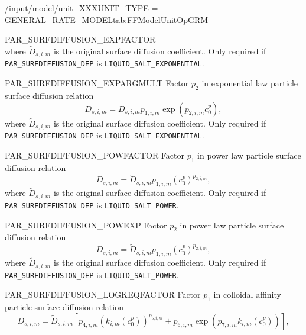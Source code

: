\begin{condsubgroup}{/input/model/unit\_XXX}{UNIT\_TYPE = GENERAL\_RATE\_MODEL}{tab:FFModelUnitOpGRM}
\begin{dataset}[unit=--,type=double,range={$\geq 0$},length={\texttt{NBND}}]{PAR\_SURFDIFFUSION\_EXPFACTOR}
\begin{equation*}
    \end{equation*}
    where $\tilde{D}_{s,i,m}$ is the original surface diffusion coefficient.
    Only required if \texttt{PAR\_SURFDIFFUSION\_DEP} is \texttt{LIQUID\_SALT\_EXPONENTIAL}.
  \end{dataset}
  \begin{dataset}[unit=\si{\cubic\metre\of{MP}\per\mol},type=double,range={$\mathds{R}$},length={\texttt{NBND}}]{PAR\_SURFDIFFUSION\_EXPARGMULT}
    Factor $p_2$ in exponential law particle surface diffusion relation
    \begin{equation*}
      D_{s,i,m} = \tilde{D}_{s,i,m} p_{1,i,m} \exp(p_{2,i,m} c^p_0),
    \end{equation*}
    where $\tilde{D}_{s,i,m}$ is the original surface diffusion coefficient.
    Only required if \texttt{PAR\_SURFDIFFUSION\_DEP} is \texttt{LIQUID\_SALT\_EXPONENTIAL}.
  \end{dataset}
  \begin{dataset}[unit=--,type=double,range={$\geq 0$},length={\texttt{NBND}}]{PAR\_SURFDIFFUSION\_POWFACTOR}
    Factor $p_1$ in power law particle surface diffusion relation
    \begin{equation*}
      D_{s,i,m} = \tilde{D}_{s,i,m} p_{1,i,m} \left(c^p_0\right)^{p_{2,i,m}},
    \end{equation*}
    where $\tilde{D}_{s,i,m}$ is the original surface diffusion coefficient.
    Only required if \texttt{PAR\_SURFDIFFUSION\_DEP} is \texttt{LIQUID\_SALT\_POWER}.
  \end{dataset}
  \begin{dataset}[unit=--,type=double,range={$\mathds{R}$},length={\texttt{NBND}}]{PAR\_SURFDIFFUSION\_POWEXP}
    Factor $p_2$ in power law particle surface diffusion relation
    \begin{equation*}
      D_{s,i,m} = \tilde{D}_{s,i,m} p_{1,i,m} \left(c^p_0\right)^{p_{2,i,m}},
    \end{equation*}
    where $\tilde{D}_{s,i,m}$ is the original surface diffusion coefficient.
    Only required if \texttt{PAR\_SURFDIFFUSION\_DEP} is \texttt{LIQUID\_SALT\_POWER}.
  \end{dataset}
  \begin{dataset}[unit=--,type=double,range={$\mathds{R}$},length={\texttt{NBND}}]{PAR\_SURFDIFFUSION\_LOGKEQFACTOR}
    Factor $p_1$ in colloidal affinity particle surface diffusion relation
    \begin{equation*}
      D_{s,i,m} = \tilde{D}_{s,i,m} \left[ p_{4,i,m} \left(k_{i,m}\left(c^p_0\right)\right)^{p_{5,i,m}} + p_{6,i,m} \exp\left( p_{7,i,m} k_{i,m}\left( c^p_0 \right) \right) \right],

\end{equation*}
\end{dataset}
\end{condsubgroup}
